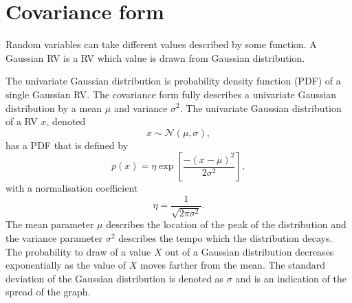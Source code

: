 \documentclass[12pt,oneside,openany,a4paper, %
afrikaans,english,
]{memoir}
\numberwithin{equation}{chapter}
\begin{document}
\section{Covariance form}
Random variables can take different values described by some function. A Gaussian RV is a RV which value is drawn from Gaussian distribution.

The univariate Gaussian distribution is probability density function (PDF) of a single Gaussian RV. The covariance form fully describes a univariate Gaussian distribution by a mean $\mu$ and variance $\sigma^2$.
The univariate Gaussian distribution of a RV $x$, denoted
\begin{equation}
x\sim\mathcal{N}(\mu,\sigma),
\end{equation}
has a PDF that is defined by
\begin{equation}\label{eq:1}
p(x) = \eta\exp\left[\frac{-(x-\mu)^2}{2\sigma^2}\right],
\end{equation}
with a normalisation coefficient 
\begin{equation}\label{eq:2}
\eta = \frac{1}{\sqrt{2\pi\sigma^2}}.
\end{equation}
The mean parameter $\mu$ describes the location of the peak of the distribution and the variance parameter $\sigma^2$ describes the tempo which the distribution decays. The probability to draw of a value $X$ out of a Gaussian distribution decreases exponentially as the value of $X$ moves farther from the mean. The standard deviation of the Gaussian distribution is denoted as $\sigma$ and is an indication of the spread of the graph.
\end{document}
